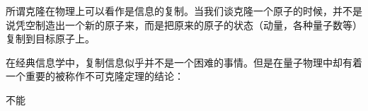 
所谓克隆在物理上可以看作是信息的复制。当我们谈克隆一个原子的时候，并不是说凭空制造出一个新的原子来，而是把原来的原子的状态（动量，各种量子数等）复制到目标原子上。

在经典信息学中，复制信息似乎并不是一个困难的事情。但是在量子物理中却有着一个重要的被称作不可克隆定理的结论：
\begin{theorem}{}
不能
\end{theorem}